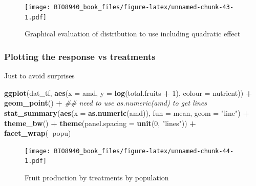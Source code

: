 \documentclass[
  12pt,
]{book}
\newenvironment{Shaded}{\begin{snugshade}}{\end{snugshade}}
\newcommand{\CommentTok}[1]{\textcolor[rgb]{0.56,0.35,0.01}{\textit{#1}}}
\newcommand{\DataTypeTok}[1]{\textcolor[rgb]{0.13,0.29,0.53}{#1}}
\newcommand{\DecValTok}[1]{\textcolor[rgb]{0.00,0.00,0.81}{#1}}
\newcommand{\KeywordTok}[1]{\textcolor[rgb]{0.13,0.29,0.53}{\textbf{#1}}}
\newcommand{\NormalTok}[1]{#1}
\newcommand{\OperatorTok}[1]{\textcolor[rgb]{0.81,0.36,0.00}{\textbf{#1}}}
\newcommand{\StringTok}[1]{\textcolor[rgb]{0.31,0.60,0.02}{#1}}
\begin{document}
\begin{figure}
\centering
\texttt{[image: BIO8940\_book\_files/figure-latex/unnamed-chunk-43-1.pdf]}
\caption{\label{fig:unnamed-chunk-43}Graphical evaluation of distribution to use including quadratic effect}
\end{figure}

\hypertarget{plotting-the-response-vs-treatments}{%
\subsubsection{Plotting the response vs treatments}\label{plotting-the-response-vs-treatments}}

Just to avoid surprises

\begin{Shaded}
\begin{Highlighting}[]
\KeywordTok{ggplot}\NormalTok{(dat_tf, }\KeywordTok{aes}\NormalTok{(}\DataTypeTok{x =}\NormalTok{ amd, }\DataTypeTok{y =} \KeywordTok{log}\NormalTok{(total.fruits }\OperatorTok{+}\StringTok{ }\DecValTok{1}\NormalTok{), }\DataTypeTok{colour =}\NormalTok{ nutrient)) }\OperatorTok{+}
\StringTok{  }\KeywordTok{geom_point}\NormalTok{() }\OperatorTok{+}
\StringTok{  }\CommentTok{## need to use as.numeric(amd) to get lines}
\StringTok{  }\KeywordTok{stat_summary}\NormalTok{(}\KeywordTok{aes}\NormalTok{(}\DataTypeTok{x =} \KeywordTok{as.numeric}\NormalTok{(amd)), }\DataTypeTok{fun =}\NormalTok{ mean, }\DataTypeTok{geom =} \StringTok{"line"}\NormalTok{) }\OperatorTok{+}
\StringTok{  }\KeywordTok{theme_bw}\NormalTok{() }\OperatorTok{+}
\StringTok{  }\KeywordTok{theme}\NormalTok{(}\DataTypeTok{panel.spacing =} \KeywordTok{unit}\NormalTok{(}\DecValTok{0}\NormalTok{, }\StringTok{"lines"}\NormalTok{)) }\OperatorTok{+}
\StringTok{  }\KeywordTok{facet_wrap}\NormalTok{(}\OperatorTok{~}\NormalTok{popu)}
\end{Highlighting}
\end{Shaded}

\begin{figure}
\centering
\texttt{[image: BIO8940\_book\_files/figure-latex/unnamed-chunk-44-1.pdf]}
\caption{\label{fig:unnamed-chunk-44}Fruit production by treatments by population}
\end{figure}
\end{document}
